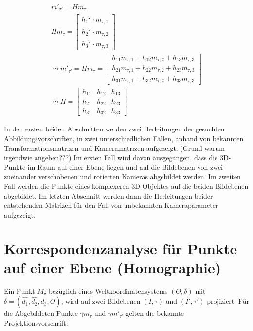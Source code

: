 \begin{gather}
m'_{\tau'} = Hm_{\tau}\\
Hm_{\tau} = \begin{bmatrix}
{h_1}^T \cdot m_{\tau,1}\\{h_2}^T \cdot m_{\tau,2}\\{h_3}^T \cdot m_{\tau,3}
\end{bmatrix} \\
\leadsto 
m'_{\tau'}= Hm_{\tau}= \begin{bmatrix}
h_{11}m_{\tau,1}+h_{12}m_{\tau,2}+h_{13}m_{\tau,3}\\
h_{21}m_{\tau,1}+h_{22}m_{\tau,2}+h_{23}m_{\tau,3}\\
h_{31}m_{\tau,1}+h_{32}m_{\tau,2}+h_{33}m_{\tau,3}
\end{bmatrix}\\
\leadsto 
H=\begin{bmatrix}
h_{11}&h_{12}&h_{13}\\
h_{21}&h_{22}&h_{23}\\
h_{31}&h_{32}&h_{33}
\end{bmatrix}
\end{gather}


In den ersten beiden Abschnitten werden zwei Herleitungen der gesuchten Abbildungsvorschriften, in zwei unterschiedlichen Fällen, anhand von bekannten Transformationsmatrizen und Kameramatrizen aufgezeigt. (Grund warum irgendwie angeben???)
Im ersten Fall wird davon ausgegangen, dass die 3D-Punkte im Raum auf einer Ebene liegen und auf die Bildebenen von zwei zueinander verschobenen und rotierten Kameras abgebildet werden. Im zweiten Fall werden die Punkte eines komplexeren 3D-Objektes auf die beiden Bildebenen abgebildet. Im letzten Abschnitt werden dann die Herleitungen beider entstehenden Matrizen für den Fall von unbekannten Kameraparameter aufgezeigt. 

 
\section{Korrespondenzanalyse für Punkte auf einer Ebene (Homographie)}
 
Ein Punkt $M_\delta$ bezüglich eines Weltkoordinatensystems $(O,\delta)$ mit $\delta = (\hat{d_1},\hat{d_2},\hat{d_3},O)$, wird auf zwei Bildebenen $(I,\tau)$ und $(I',\tau')$ projiziert. Für die Abgebildeten Punkte $\gamma m_\tau$ und $\gamma m'_{\tau'}$ gelten die bekannte Projektionsvorschrift:

